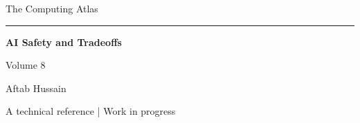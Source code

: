 \documentclass[11pt,oneside,openany]{book}
\begin{document}
\frontmatter
\begin{titlepage}
\centering
\vspace*{3.7cm}
{\Large The Computing Atlas\par}
\vspace{0.65cm}
\rule{0.6\textwidth}{0.5pt}\par
\vspace{0.75cm}
{\Huge\bfseries AI Safety and Tradeoffs\par}
\vspace{1.0cm}
{\large Volume 8\par}
\vfill
{\large Aftab Hussain\par}
\vspace{0.6cm}
{\small A technical reference | Work in progress\par}
\vspace{1.2cm}
\end{titlepage}
\tableofcontents
\mainmatter

\end{document}
